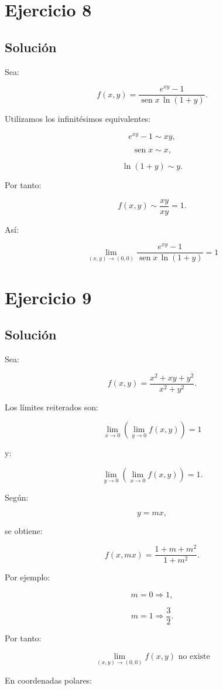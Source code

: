 \documentclass[11pt,a4paper]{article}
\newcommand{\sen}{\operatorname{sen}}
\begin{document}
\section{Ejercicio 8}
\subsection{Solución}

Sea:

\[
f(x,y)
=
\frac{e^{xy}-1}
{\sen x\,\ln(1+y)}.
\]

Utilizamos los infinitésimos equivalentes:

\[
e^{xy}-1\sim xy,
\]

\[
\sen x\sim x,
\]

\[
\ln(1+y)\sim y.
\]

Por tanto:

\[
f(x,y)
\sim
\frac{xy}{xy}
=
1.
\]

Así:

\[
\boxed{
\lim_{(x,y)\to(0,0)}
\frac{e^{xy}-1}
{\sen x\,\ln(1+y)}
=
1
}
\]

\section{Ejercicio 9}
\subsection{Solución}

Sea:

\[
f(x,y)
=
\frac{x^2+xy+y^2}{x^2+y^2}.
\]

Los límites reiterados son:

\[
\lim_{x\to0}
\left(
\lim_{y\to0}f(x,y)
\right)
=
1
\]

y:

\[
\lim_{y\to0}
\left(
\lim_{x\to0}f(x,y)
\right)
=
1.
\]

Según:

\[
y=mx,
\]

se obtiene:

\[
f(x,mx)
=
\frac{1+m+m^2}{1+m^2}.
\]

Por ejemplo:

\[
m=0
\Longrightarrow
1,
\]

\[
m=1
\Longrightarrow
\frac32.
\]

Por tanto:

\[
\boxed{
\lim_{(x,y)\to(0,0)}f(x,y)
\text{ no existe}
}
\]

En coordenadas polares:
\end{document}
